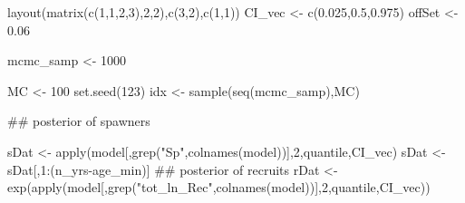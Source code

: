 \documentclass[
  11pt,
]{article}
\newenvironment{Shaded}{}{}
\newcommand{\CommentTok}[1]{\textcolor[rgb]{0.00,0.50,0.00}{#1}}
\newcommand{\DecValTok}[1]{#1}
\newcommand{\FloatTok}[1]{#1}
\newcommand{\KeywordTok}[1]{\textcolor[rgb]{0.00,0.00,1.00}{#1}}
\newcommand{\NormalTok}[1]{#1}
\newcommand{\OperatorTok}[1]{#1}
\newcommand{\StringTok}[1]{\textcolor[rgb]{0.00,0.50,0.50}{#1}}
\begin{document}
\begin{Shaded}
\begin{Highlighting}[]
\KeywordTok{layout}\NormalTok{(}\KeywordTok{matrix}\NormalTok{(}\KeywordTok{c}\NormalTok{(}\DecValTok{1}\NormalTok{,}\DecValTok{1}\NormalTok{,}\DecValTok{2}\NormalTok{,}\DecValTok{3}\NormalTok{),}\DecValTok{2}\NormalTok{,}\DecValTok{2}\NormalTok{),}\KeywordTok{c}\NormalTok{(}\DecValTok{3}\NormalTok{,}\DecValTok{2}\NormalTok{),}\KeywordTok{c}\NormalTok{(}\DecValTok{1}\NormalTok{,}\DecValTok{1}\NormalTok{))}
\NormalTok{CI_vec <-}\StringTok{ }\KeywordTok{c}\NormalTok{(}\FloatTok{0.025}\NormalTok{,}\FloatTok{0.5}\NormalTok{,}\FloatTok{0.975}\NormalTok{)}
\NormalTok{offSet <-}\StringTok{ }\FloatTok{0.06}

\NormalTok{mcmc_samp <-}\StringTok{ }\DecValTok{1000}

\NormalTok{MC <-}\StringTok{ }\DecValTok{100}
\KeywordTok{set.seed}\NormalTok{(}\DecValTok{123}\NormalTok{)}
\NormalTok{idx <-}\StringTok{ }\KeywordTok{sample}\NormalTok{(}\KeywordTok{seq}\NormalTok{(mcmc_samp),MC)}

\CommentTok{## posterior of spawners}

\NormalTok{sDat <-}\StringTok{ }\KeywordTok{apply}\NormalTok{(model[,}\KeywordTok{grep}\NormalTok{(}\StringTok{"Sp"}\NormalTok{,}\KeywordTok{colnames}\NormalTok{(model))],}\DecValTok{2}\NormalTok{,quantile,CI_vec)}
\NormalTok{sDat <-}\StringTok{ }\NormalTok{sDat[,}\DecValTok{1}\OperatorTok{:}\NormalTok{(n_yrs}\OperatorTok{-}\NormalTok{age_min)]}
\CommentTok{## posterior of recruits}
\NormalTok{rDat <-}\StringTok{ }\KeywordTok{exp}\NormalTok{(}\KeywordTok{apply}\NormalTok{(model[,}\KeywordTok{grep}\NormalTok{(}\StringTok{"tot_ln_Rec"}\NormalTok{,}\KeywordTok{colnames}\NormalTok{(model))],}\DecValTok{2}\NormalTok{,quantile,CI_vec))}



\end{Highlighting}
\end{Shaded}
\end{document}

